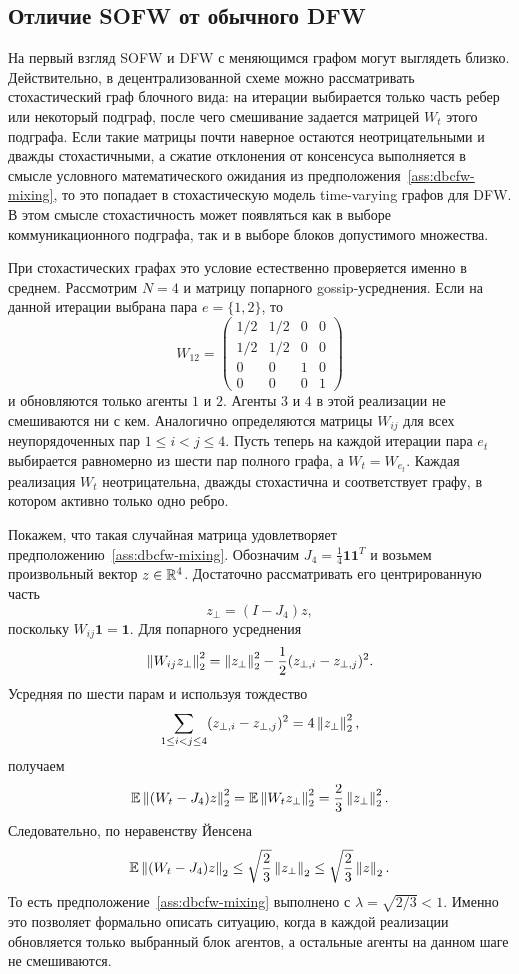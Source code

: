 \subsection{Отличие SOFW от обычного DFW}

На первый взгляд SOFW и DFW с меняющимся графом могут выглядеть близко.
Действительно, в децентрализованной схеме можно рассматривать стохастический граф блочного
вида: на итерации выбирается только часть ребер или некоторый подграф, после чего смешивание
задается матрицей $W_t$ этого подграфа.
Если такие матрицы почти наверное остаются неотрицательными и дважды стохастичными, а
сжатие отклонения от консенсуса выполняется в смысле условного математического ожидания из
предположения~\ref{ass:dbcfw-mixing}, то это попадает в стохастическую модель
time-varying графов для DFW.
В этом смысле стохастичность может появляться как в выборе коммуникационного подграфа, так и
в выборе блоков допустимого множества.

При стохастических графах это условие естественно проверяется именно в среднем.
Рассмотрим $N=4$ и матрицу попарного gossip-усреднения.
Если на данной итерации выбрана пара $e=\{1,2\}$, то
\[
    W_{12}=
    \begin{pmatrix}
        1/2 & 1/2 & 0 & 0\\
        1/2 & 1/2 & 0 & 0\\
        0 & 0 & 1 & 0\\
        0 & 0 & 0 & 1
    \end{pmatrix}
\]
и обновляются только агенты $1$ и $2$.
Агенты $3$ и $4$ в этой реализации не смешиваются ни с кем.
Аналогично определяются матрицы $W_{ij}$ для всех неупорядоченных пар
$1\leq i<j\leq4$.
Пусть теперь на каждой итерации пара $e_t$ выбирается равномерно из шести пар полного
графа, а $W_t=W_{e_t}$.
Каждая реализация $W_t$ неотрицательна, дважды стохастична и соответствует графу, в котором
активно только одно ребро.

Покажем, что такая случайная матрица удовлетворяет
предположению~\ref{ass:dbcfw-mixing}.
Обозначим $J_4=\frac14\mathbf 1\mathbf 1^T$ и возьмем произвольный вектор
$z\in\mathbb{R}^4$.
Достаточно рассматривать его центрированную часть
\[
    z_\perp=(I-J_4)z,
\]
поскольку $W_{ij}\mathbf 1=\mathbf 1$.
Для попарного усреднения
\[
    \left\|W_{ij}z_\perp\right\|_2^2
    =
    \left\|z_\perp\right\|_2^2
    -
    \frac12(z_{\perp,i}-z_{\perp,j})^2.
\]
Усредняя по шести парам и используя тождество
\[
    \sum_{1\leq i<j\leq4}
    (z_{\perp,i}-z_{\perp,j})^2
    =
    4\left\|z_\perp\right\|_2^2,
\]
получаем
\[
    \mathbb{E}\left\|(W_t-J_4)z\right\|_2^2
    =
    \mathbb{E}\left\|W_tz_\perp\right\|_2^2
    =
    \frac23\left\|z_\perp\right\|_2^2.
\]
Следовательно, по неравенству Йенсена
\[
    \mathbb{E}\left\|(W_t-J_4)z\right\|_2
    \leq
    \sqrt{\frac23}\left\|z_\perp\right\|_2
    \leq
    \sqrt{\frac23}\left\|z\right\|_2.
\]
То есть предположение~\ref{ass:dbcfw-mixing} выполнено с
$\lambda=\sqrt{2/3}<1$.
Именно это позволяет формально описать ситуацию, когда в каждой реализации обновляется
только выбранный блок агентов, а остальные агенты на данном шаге не смешиваются.

